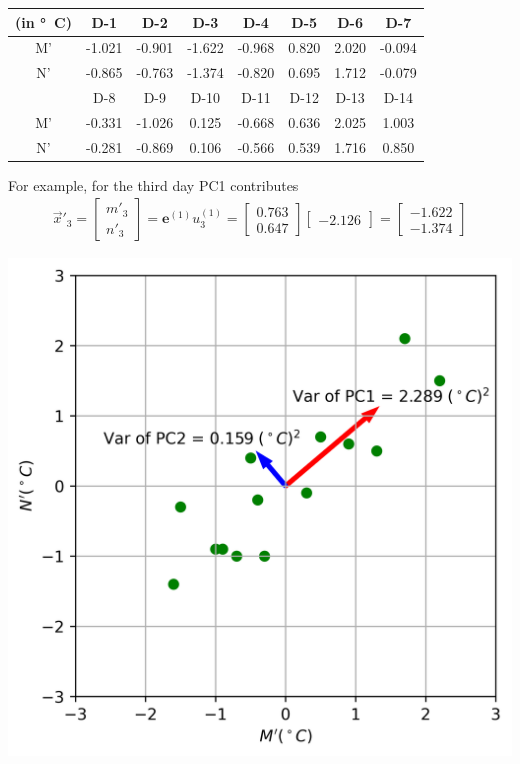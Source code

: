 \begin{solution}
\begin{center}
\begin{tabular}{|c|c|c|c|c|c|c|c|}
\hline
(in \si{\degree C}) & D-1 & D-2 & D-3 & D-4 & D-5 & D-6 & D-7 \\
\hline
M' & -1.021 & -0.901 & -1.622 & -0.968 & 0.820 & 2.020 & -0.094 \\
\hline
N' & -0.865 & -0.763 & -1.374 & -0.820 & 0.695 & 1.712 & -0.079 \\
\hline
 & D-8 & D-9 & D-10 & D-11 & D-12 & D-13 & D-14 \\
\hline
M' & -0.331 & -1.026 & 0.125 & -0.668 & 0.636 & 2.025 & 1.003 \\
\hline
N' & -0.281 & -0.869 & 0.106 & -0.566 & 0.539 & 1.716 & 0.850 \\
\hline
\end{tabular}
\end{center}
For example, for the third day PC1 contributes
\begin{align*}
\vec{x}'_3 =
\begin{bmatrix}
m'_3 \\
n'_3
\end{bmatrix}
=
\textbf{e}^{(1)}u_3^{(1)}
=
\begin{bmatrix}
0.763 \\
0.647
\end{bmatrix}
\begin{bmatrix}
-2.126
\end{bmatrix}
=
\begin{bmatrix}
-1.622 \\
-1.374  
\end{bmatrix}
\end{align*}
\begin{center}
\includegraphics[scale = 0.75]{graphics/PCA_exmp_1.png}\\

\end{center}
\end{solution}

